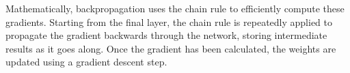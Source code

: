 Mathematically, backpropagation uses the chain rule to efficiently compute these gradients. Starting from the final layer, the chain rule is repeatedly applied to propagate the gradient backwards through the network, storing intermediate results as it goes along. Once the gradient has been calculated, the weights are updated using a gradient descent step.

\